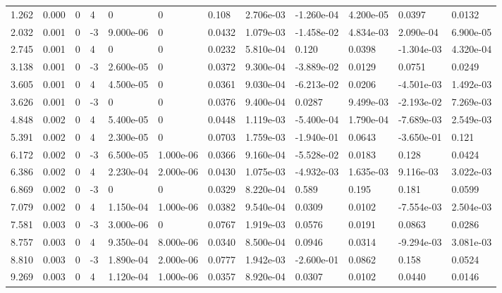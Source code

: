 \documentclass[preview]{standalone}
\begin{document}
{{\begin{tabular}{L{1.2cm}C{1.2cm} C{0.3cm}C{0.5cm} C{1.4cm}C{1.4cm} C{1.4cm}C{1.4cm} C{1.6cm}C{1.6cm} C{1.6cm}C{1.6cm}}
  1.262  &  0.000  & 0     &  4 &  0  & 0  &  0.108&   2.706e-03& -1.260e-04 & 4.200e-05   &  0.0397 & 0.0132  \\ 
  2.032  &  0.001  & 0     & -3 &  9.000e-06  & 0  &  0.0432&   1.079e-03& -1.458e-02 & 4.834e-03   &  2.090e-04 & 6.900e-05  \\ 
  2.745  &  0.001  & 0     &  4 &  0  & 0  &  0.0232&   5.810e-04& 0.120 & 0.0398   &  -1.304e-03 & 4.320e-04  \\ 
  3.138  &  0.001  & 0     & -3 &  2.600e-05  & 0  &  0.0372&   9.300e-04& -3.889e-02 & 0.0129   &  0.0751 & 0.0249  \\ 
  3.605  &  0.001  & 0     &  4 &  4.500e-05  & 0  &  0.0361&   9.030e-04& -6.213e-02 & 0.0206   &  -4.501e-03 & 1.492e-03  \\ 
  3.626  &  0.001  & 0     & -3 &  0  & 0  &  0.0376&   9.400e-04& 0.0287 & 9.499e-03   &  -2.193e-02 & 7.269e-03  \\ 
  4.848  &  0.002  & 0     &  4 &  5.400e-05  & 0  &  0.0448&   1.119e-03& -5.400e-04 & 1.790e-04   &  -7.689e-03 & 2.549e-03  \\ 
  5.391  &  0.002  & 0     &  4 &  2.300e-05  & 0  &  0.0703&   1.759e-03& -1.940e-01 & 0.0643   &  -3.650e-01 & 0.121  \\ 
  6.172  &  0.002  & 0     & -3 &  6.500e-05  & 1.000e-06  &  0.0366&   9.160e-04& -5.528e-02 & 0.0183   &  0.128 & 0.0424  \\ 
  6.386  &  0.002  & 0     &  4 &  2.230e-04  & 2.000e-06  &  0.0430&   1.075e-03& -4.932e-03 & 1.635e-03   &  9.116e-03 & 3.022e-03  \\ 
  6.869  &  0.002  & 0     & -3 &  0  & 0  &  0.0329&   8.220e-04& 0.589 & 0.195   &  0.181 & 0.0599  \\ 
  7.079  &  0.002  & 0     &  4 &  1.150e-04  & 1.000e-06  &  0.0382&   9.540e-04& 0.0309 & 0.0102   &  -7.554e-03 & 2.504e-03  \\ 
  7.581  &  0.003  & 0     & -3 &  3.000e-06  & 0  &  0.0767&   1.919e-03& 0.0576 & 0.0191   &  0.0863 & 0.0286  \\ 
  8.757  &  0.003  & 0     &  4 &  9.350e-04  & 8.000e-06  &  0.0340&   8.500e-04& 0.0946 & 0.0314   &  -9.294e-03 & 3.081e-03  \\ 
  8.810  &  0.003  & 0     & -3 &  1.890e-04  & 2.000e-06  &  0.0777&   1.942e-03& -2.600e-01 & 0.0862   &  0.158 & 0.0524  \\ 
  9.269  &  0.003  & 0     &  4 &  1.120e-04  & 1.000e-06  &  0.0357&   8.920e-04& 0.0307 & 0.0102   &  0.0440 & 0.0146  \\ 

\end{tabular}}}
\end{document}
